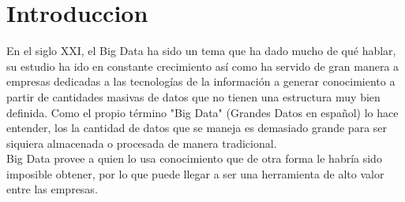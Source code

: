 \section{Introduccion}
En el siglo XXI, el Big Data ha sido un tema que ha dado mucho de qué hablar, su estudio ha ido en constante crecimiento así como ha servido de gran manera a empresas dedicadas a las tecnologías de la información a generar conocimiento a partir de cantidades masivas de datos que no tienen una estructura muy bien definida. Como el propio término "Big Data" (Grandes Datos en español) lo hace entender, los la cantidad de datos que se maneja es demasiado grande para ser siquiera almacenada o procesada de manera tradicional\cite{intro}. 
\\
Big Data provee a quien lo usa conocimiento que de otra forma le habría sido imposible obtener, por lo que puede llegar a ser una herramienta de alto valor entre las empresas.